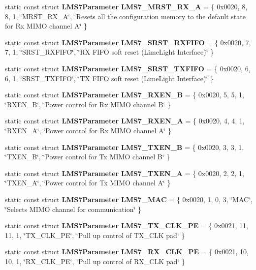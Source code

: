 \begin{DoxyCompactItemize}
static const struct {\bf L\+M\+S7\+Parameter} {\bf L\+M\+S7\+\_\+\+M\+R\+S\+T\+\_\+\+R\+X\+\_\+A} = \{ 0x0020, 8, 8, 1, \char`\"{}\+M\+R\+S\+T\+\_\+\+R\+X\+\_\+\+A\char`\"{}, \char`\"{}\+Resets all the configuration memory to the default state for Rx M\+I\+M\+O channel A\char`\"{} \}
\item 
static const struct {\bf L\+M\+S7\+Parameter} {\bf L\+M\+S7\+\_\+\+S\+R\+S\+T\+\_\+\+R\+X\+F\+I\+FO} = \{ 0x0020, 7, 7, 1, \char`\"{}\+S\+R\+S\+T\+\_\+\+R\+X\+F\+I\+F\+O\char`\"{}, \char`\"{}\+R\+X F\+I\+F\+O soft reset (\+Lime\+Light Interface)\char`\"{} \}
\item 
static const struct {\bf L\+M\+S7\+Parameter} {\bf L\+M\+S7\+\_\+\+S\+R\+S\+T\+\_\+\+T\+X\+F\+I\+FO} = \{ 0x0020, 6, 6, 1, \char`\"{}\+S\+R\+S\+T\+\_\+\+T\+X\+F\+I\+F\+O\char`\"{}, \char`\"{}\+T\+X F\+I\+F\+O soft reset (\+Lime\+Light Interface)\char`\"{} \}
\item 
static const struct {\bf L\+M\+S7\+Parameter} {\bf L\+M\+S7\+\_\+\+R\+X\+E\+N\+\_\+B} = \{ 0x0020, 5, 5, 1, \char`\"{}\+R\+X\+E\+N\+\_\+\+B\char`\"{}, \char`\"{}\+Power control for Rx M\+I\+M\+O channel B\char`\"{} \}
\item 
static const struct {\bf L\+M\+S7\+Parameter} {\bf L\+M\+S7\+\_\+\+R\+X\+E\+N\+\_\+A} = \{ 0x0020, 4, 4, 1, \char`\"{}\+R\+X\+E\+N\+\_\+\+A\char`\"{}, \char`\"{}\+Power control for Rx M\+I\+M\+O channel A\char`\"{} \}
\item 
static const struct {\bf L\+M\+S7\+Parameter} {\bf L\+M\+S7\+\_\+\+T\+X\+E\+N\+\_\+B} = \{ 0x0020, 3, 3, 1, \char`\"{}\+T\+X\+E\+N\+\_\+\+B\char`\"{}, \char`\"{}\+Power control for Tx M\+I\+M\+O channel B\char`\"{} \}
\item 
static const struct {\bf L\+M\+S7\+Parameter} {\bf L\+M\+S7\+\_\+\+T\+X\+E\+N\+\_\+A} = \{ 0x0020, 2, 2, 1, \char`\"{}\+T\+X\+E\+N\+\_\+\+A\char`\"{}, \char`\"{}\+Power control for Tx M\+I\+M\+O channel A\char`\"{} \}
\item 
static const struct {\bf L\+M\+S7\+Parameter} {\bf L\+M\+S7\+\_\+\+M\+AC} = \{ 0x0020, 1, 0, 3, \char`\"{}\+M\+A\+C\char`\"{}, \char`\"{}\+Selects M\+I\+M\+O channel for communication\char`\"{} \}
\item 
static const struct {\bf L\+M\+S7\+Parameter} {\bf L\+M\+S7\+\_\+\+T\+X\+\_\+\+C\+L\+K\+\_\+\+PE} = \{ 0x0021, 11, 11, 1, \char`\"{}\+T\+X\+\_\+\+C\+L\+K\+\_\+\+P\+E\char`\"{}, \char`\"{}\+Pull up control of T\+X\+\_\+\+C\+L\+K pad\char`\"{} \}
\item 
static const struct {\bf L\+M\+S7\+Parameter} {\bf L\+M\+S7\+\_\+\+R\+X\+\_\+\+C\+L\+K\+\_\+\+PE} = \{ 0x0021, 10, 10, 1, \char`\"{}\+R\+X\+\_\+\+C\+L\+K\+\_\+\+P\+E\char`\"{}, \char`\"{}\+Pull up control of R\+X\+\_\+\+C\+L\+K pad\char`\"{} \}

\end{DoxyCompactItemize}
